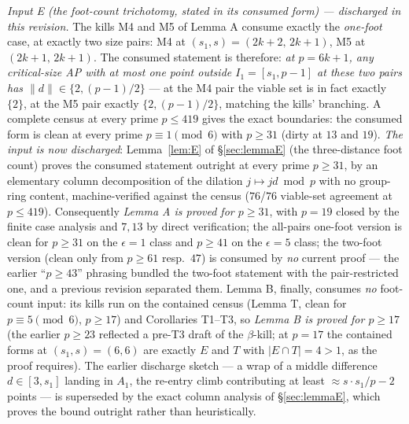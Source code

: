 \emph{Input E (the foot-count trichotomy, stated in its consumed form) ---
discharged in this revision.}
The kills M4 and M5 of Lemma A consume exactly the \emph{one-foot} case, at
exactly two size pairs: M4 at $(s_1,s)=(2k{+}2,\,2k{+}1)$, M5 at
$(2k{+}1,\,2k{+}1)$. The consumed statement is therefore: \emph{at
$p=6k+1$, any critical-size AP with at most one point outside
$I_1=[s_1,p-1]$ at these two pairs has $\|d\|\in\{2,(p{-}1)/2\}$} --- at
the M4 pair the viable set is in fact exactly $\{2\}$, at the M5 pair
exactly $\{2,(p{-}1)/2\}$, matching the kills' branching. A complete
census at every prime $p\le419$ gives the exact boundaries: the consumed
form is clean at every prime $p\equiv1\pmod6$ with $p\ge31$ (dirty at $13$
and $19$). \emph{The input is now discharged}: Lemma~\ref{lem:E} of
\S\ref{sec:lemmaE} (the three-distance foot count) proves the consumed
statement outright at every prime $p\ge31$, by an elementary column
decomposition of the dilation $j\mapsto jd\bmod p$ with no group-ring
content, machine-verified against the census ($76$/$76$ viable-set
agreement at $p\le419$). Consequently \emph{Lemma A is proved for
$p\ge31$}, with $p=19$ closed by the finite case analysis and $7,13$ by
direct verification; the all-pairs one-foot version is clean for $p\ge31$
on the $\epsilon=1$ class and $p\ge41$ on the $\epsilon=5$ class; the two-foot
version (clean only from $p\ge61$ resp.\ $47$) is consumed by \emph{no}
current proof --- the earlier ``$p\ge43$'' phrasing bundled the two-foot
statement with the pair-restricted one, and a previous revision separated
them. Lemma B, finally, consumes \emph{no} foot-count input: its kills run
on the contained census (Lemma T, clean for $p\equiv5\pmod6$, $p\ge17$) and
Corollaries T1--T3, so \emph{Lemma B is proved for $p\ge17$} (the earlier
$p\ge23$ reflected a pre-T3 draft of the $\beta$-kill; at $p=17$ the
contained forms at $(s_1,s)=(6,6)$ are exactly $E$ and $T$ with
$|E\cap T|=4>1$, as the proof requires). The earlier discharge sketch ---
a wrap of a middle difference $d\in[3,s_1]$ landing in $A_1$, the
re-entry climb contributing at least $\approx s\cdot s_1/p-2$ points ---
is superseded by the exact column analysis of \S\ref{sec:lemmaE}, which
proves the bound outright rather than heuristically.

